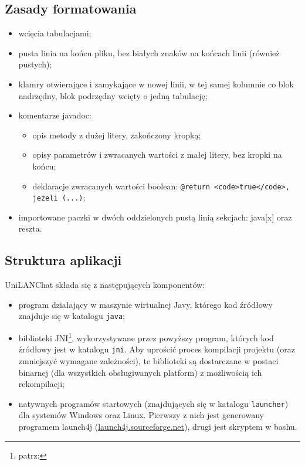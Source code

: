\documentclass[11pt,leqno]{article}
\begin{document}
\subsection{Zasady formatowania}
\begin{itemize}
	\item wcięcia tabulacjami;
	\item pusta linia na końcu pliku, bez białych znaków na końcach linii (również pustych);
	\item klamry otwierające i zamykające w nowej linii, w tej samej kolumnie co blok
	nadrzędny, blok podrzędny wcięty o jedną tabulację;
	\item komentarze javadoc:
	\begin{itemize}
		\item opis metody z dużej litery, zakończony kropką;
		\item opisy parametrów i zwracanych wartości z małej litery, bez kropki na końcu;
		\item deklaracje zwracanych wartości boolean:
		\texttt{@return <code>true</code>, jeżeli (...)};
	\end{itemize}
	\item importowane paczki w dwóch oddzielonych pustą linią sekcjach: java[x] oraz reszta.
\end{itemize}

\subsection{Struktura aplikacji}

UniLANChat składa się z następujących komponentów:
\begin{itemize}
	\item program działający w maszynie wirtualnej Javy, którego kod źródłowy znajduje się
	w katalogu \texttt{java};
	\item biblioteki JNI\footnote{patrz: }, wykorzystywane przez
	powyższy program, których kod źródłowy jest w katalogu \texttt{jni}. Aby uprościć proces
	kompilacji projektu (oraz zmniejszyć wymagane zależności), te biblioteki są dostarczane
	w postaci binarnej (dla wszystkich obsługiwanych platform) z możliwością ich rekompilacji;
	\item natywnych programów startowych (znajdujących się w katalogu \texttt{launcher}) dla
	systemów Windows oraz Linux. Pierwszy z nich jest generowany programem
	launch4j (\href{http://launch4j.sourceforge.net}{launch4j.sourceforge.net}), drugi jest skryptem w bashu.
\end{itemize}
\end{document}
